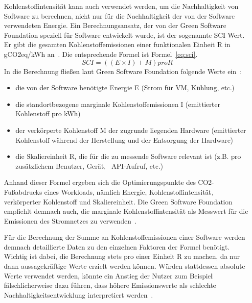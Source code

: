 Kohlenstoffintensität kann auch verwendet werden, um die Nachhaltigkeit von Software zu berechnen, nicht nur für die Nachhaltigkeit der von der Software verwendeten Energie.
Ein Berechnungsansatz, der von der Green Software Foundation speziell für Software entwickelt wurde, ist der sogenannte \ac{SCI} Wert.
Er gibt die gesamten Kohlenstoffemissionen einer funktionalen Einheit R in g\ac{CO2}eq/\ac{kWh} an~\cite{GreenSoftwareFoundation.2022}.
Die entsprechende Formel ist Formel~\ref{eq:sci}.
\begin{equation}
 \label{eq:sci}
 SCI = ((E \times I) + M) pro R
\end{equation}
In die Berechnung fließen laut Green Software Foundation folgende Werte ein~\cite{GreenSoftwareFoundation.2022}:
\begin{itemize}
 \item die von der Software benötigte Energie E (Strom für \ac{VM}, Kühlung, etc.)
 \item die standortbezogene marginale Kohlenstoffemissionen I (emittierter Kohlenstoff pro \ac{kWh})
 \item der verkörperte Kohlenstoff M der zugrunde liegenden Hardware (emittierter Kohlenstoff während der Herstellung und der Entsorgung der Hardware)
 \item die Skaliereinheit R, die für die zu messende Software relevant ist (z.B. pro zusätzlichem Benutzer, Gerät, ~\ac{API}-Aufruf, etc.)
\end{itemize}
Anhand dieser Formel ergeben sich die Optimierungspunkte des \ac{CO2}-Fußabdrucks eines Workloads, nämlich Energie, Kohlenstoffintensität, verkörperter Kohlenstoff und Skaliereinheit.
Die Green Software Foundation empfiehlt demnach auch, die marginale Kohlenstoffintensität als Messwert für die Emissionen des Stromnetzes zu verwenden~\cite{GreenSoftwareFoundation.2022b}.

Für die Berechnung der Summe an Kohlenstoffemissionen einer Software werden demnach detaillierte Daten zu den einzelnen Faktoren der Formel benötigt.
Wichtig ist dabei, die Berechnung stets pro einer Einheit R zu machen, da nur dann aussagekräftige Werte erzielt werden können.
Würden stattdessen absolute Werte verwendet werden, könnte ein Anstieg der Nutzer zum Beispiel fälschlicherweise dazu führen, dass höhere Emissionswerte als schlechte Nachhaltigkeitsentwicklung interpretiert werden~\cite{GreenSoftwareFoundation.2022}.

